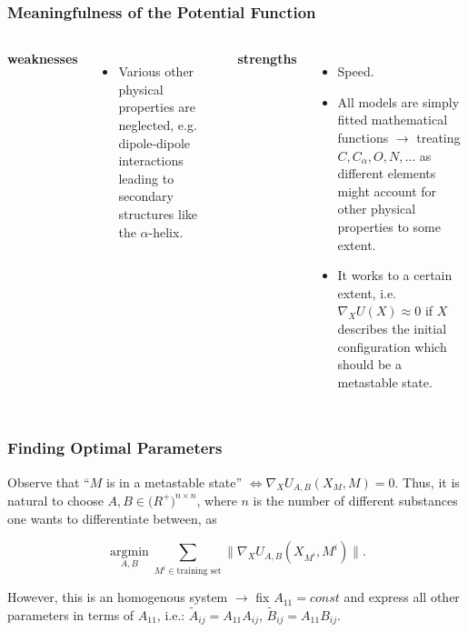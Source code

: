 \documentclass{beamer}
\begin{document}

\begin{frame}
\frametitle{Meaningfulness of the Potential Function}
\begin{columns}[t]

\textbf{weaknesses}
\begin{itemize}
	\item Various other physical properties are neglected, e.g. dipole-dipole interactions leading to secondary structures like the $\alpha$-helix.
\end{itemize}

\textbf{strengths}
\begin{itemize}
	\item<2-> Speed.
	\item<3-> All models are simply fitted mathematical functions $\rightarrow$ treating $C,C_\alpha,O,N,\dots$ as different elements might account for other physical properties to some extent.
	\item<4-> It works to a certain extent, i.e. $\nabla_X U(X)\approx 0$ if $X$ describes the initial configuration which should be a metastable state.
\end{itemize}

\end{columns}


\end{frame}


\begin{frame}
\frametitle{Finding Optimal Parameters}
Observe that ``$M$ is in a metastable state'' $\Leftrightarrow \nabla_X U_{A,B}(X_M,M)=0$.
Thus, it is natural to choose $A,B \in\mathbb (R^+)^{n\times n}$, where $n$ is the number of different substances one wants to differentiate between, as

$$\underset{A,B}{\operatorname{argmin}} \sum_{M^i\in\text{training set}}\|\nabla_X U_{A,B}(X_{M^i},M^i)\|.$$

However, this is an homogenous system $\rightarrow$ fix $A_{11} = \textit{const}$ and express all other parameters in terms of $A_{11}$, i.e.: $\tilde A_{ij} = A_{11}A_{ij}$, $\tilde B_{ij} = A_{11}B_{ij}$.

\end{frame}

\end{document}
